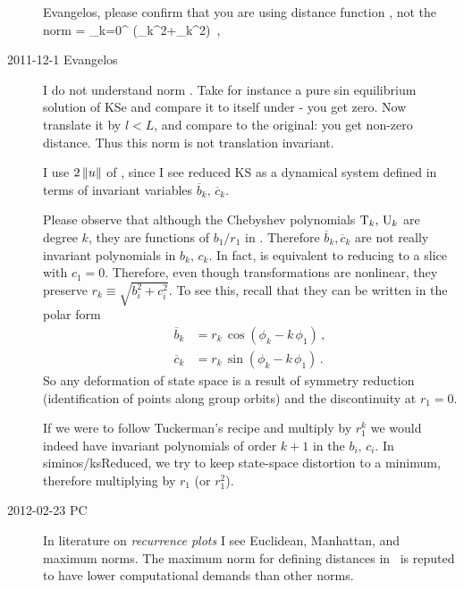 \begin{description}
Evangelos, please confirm that you are using distance function ,
not the norm
\beq
{}  =   {\textstyle{}} \sum_{k=0}^{\infty}
   (_k^2+_k^2)
\,,
\label{normNotGood} \eeq

\item[2011-12-1 Evangelos] I do not understand norm . Take for instance a pure sin
equilibrium solution of KSe and compare it to itself under  - you get zero. Now
translate it by $l<L$, and compare to the original: you get non-zero distance. Thus this norm is
not translation invariant.

I use $2\,\|{u}\|$ of , since I see reduced KS as a
dynamical system defined in terms of invariant variables
$\overline{b}_k,\,\overline{c}_k$.

Please observe that although the Chebyshev polynomials
$\mathrm{T}_k,\,\mathrm{U}_k$ are degree $k$, they are functions of $b_1/r_1$ in
. Therefore $\overline{b}_k, \overline{c}_k $ are not
really invariant polynomials in $b_k,\,c_k$. In fact, 
is equivalent to reducing to a slice with $c_1=0$. Therefore, even though
transformations  are nonlinear, they preserve
$r_k\equiv\sqrt{b_i^2+c_i^2}$. To see this, recall that they can be
written in the polar form
\bseq\label{eq:SO2polar0}
  \begin{align}
    \overline{b}_k &=
		    r_k\, \cos(\phi_k-k\,\phi_1)\,, \label{eq:SO2polar1}\\
    \overline{c}_k &=
		    r_k\, \sin(\phi_k-k\,\phi_1)\,.\label{eq:SO2polar2}
  \end{align}
\eseq
So any deformation of state space is a result of symmetry reduction
(identification of points along group orbits) and the discontinuity at
$r_1=0$.

If we were to follow Tuckerman's recipe and multiply 
by $r_1^k$ we would indeed have invariant polynomials of order $k+1$ in
the $b_i,\,c_i$. In siminos/ksReduced, we try to keep state-space
distortion to a minimum, therefore multiplying by $r_1$ (or $r_1^2$).

\item[2012-02-23 PC]
In literature on \emph{recurrence plots} I see Euclidean, Manhattan, and
maximum norms. The maximum norm for defining distances in \statesp\ is
reputed to have lower computational demands than other norms.

\end{description}



